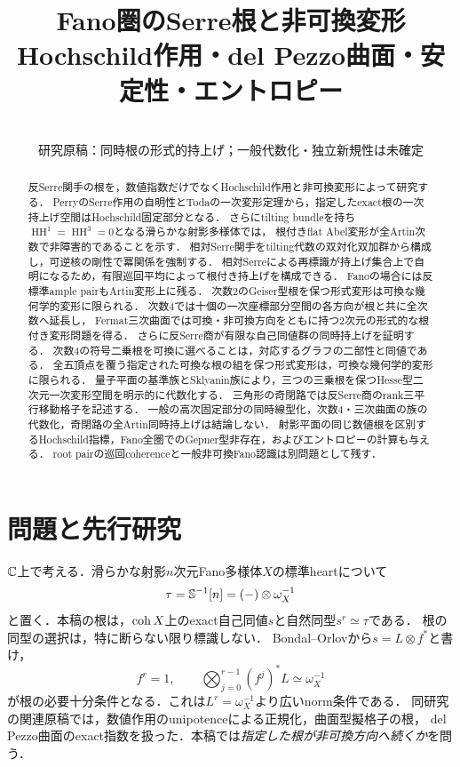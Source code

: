 \documentclass[11pt,a4paper]{ltjsarticle}
\title{Fano圏のSerre根と非可換変形\\\large Hochschild作用・del Pezzo曲面・安定性・エントロピー}
\author{}
\date{\versiondate\\研究原稿：同時根の形式的持上げ；一般代数化・独立新規性は未確定}
\newcommand{\HH}{\operatorname{HH}}
\begin{document}
\maketitle
\begin{abstract}
反Serre関手の根を，数値指数だけでなくHochschild作用と非可換変形によって研究する．
PerryのSerre作用の自明性とTodaの一次変形定理から，指定したexact根の一次持上げ空間はHochschild固定部分となる．
さらにtilting bundleを持ち$\HH^1=\HH^3=0$となる滑らかな射影多様体では，
根付きflat Abel変形が全Artin次数で非障害的であることを示す．
相対Serre関手をtilting代数の双対化双加群から構成し，可逆核の剛性で冪関係を強制する．
相対Serreによる再標識が持上げ集合上で自明になるため，有限巡回平均によって根付き持上げを構成できる．
Fanoの場合には反標準ample pairもArtin変形上に残る．
次数2のGeiser型根を保つ形式変形は可換な幾何学的変形に限られる．
次数4では十個の一次座標部分空間の各方向が根と共に全次数へ延長し，
Fermat三次曲面では可換・非可換方向をともに持つ2次元の形式的な根付き変形問題を得る．
さらに反Serre商が有限な自己同値群の同時持上げを証明する．
次数4の符号二乗根を可換に選べることは，対応するグラフの二部性と同値である．
全五頂点を覆う指定された可換な根の組を保つ形式変形は，可換な幾何学的変形に限られる．
量子平面の基準族とSklyanin族により，三つの三乗根を保つHesse型二次元一次変形空間を明示的に代数化する．
三角形の奇閉路では反Serre商のrank三平行移動格子を記述する．
一般の高次固定部分の同時線型化，次数4・三次曲面の族の代数化，奇閉路の全Artin同時持上げは結論しない．
射影平面の同じ数値根を区別するHochschild指標，Fano全圏でのGepner型非存在，およびエントロピーの計算も与える．
root pairの巡回coherenceと一般非可換Fano認識は別問題として残す．
\end{abstract}
{\small\tableofcontents}

\section{問題と先行研究}
\label{sec:intro}
$\mathbb C$上で考える．滑らかな射影$n$次元Fano多様体$X$の標準heartについて
\[
 \tau=\mathbb S^{-1}[n]=(-)\otimes\omega_X^{-1}
\]
と置く．本稿の根は，$\operatorname{coh} X$上のexact自己同値$s$と自然同型$s^r\simeq\tau$である．
根の同型の選択は，特に断らない限り標識しない．
Bondal--Orlov\cite[Theorem 3.1]{BO}から$s=L\otimes f^*$と書け，
\begin{equation}\label{eq:norm}
 f^r=1,\qquad \bigotimes_{j=0}^{r-1}(f^j)^*L\simeq\omega_X^{-1}
\end{equation}
が根の必要十分条件となる．これは$L^r=\omega_X^{-1}$より広いnorm条件である．
同研究の関連原稿\cite{Index}では，数値作用のunipotenceによる正規化，曲面型擬格子の根，
del Pezzo曲面のexact指数を扱った．本稿では\emph{指定した根が非可換方向へ続くか}を問う．
\end{document}
